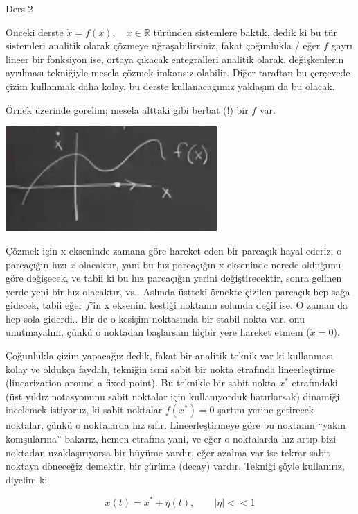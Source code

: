\documentclass[12pt,fleqn]{article}\usepackage{../../common}
\begin{document}
Ders 2

Önceki derste $\dot{x} = f(x), \quad x \in \mathbb{R}$ türünden sistemlere
baktık, dedik ki bu tür sistemleri analitik olarak çözmeye uğraşabilirsiniz,
fakat çoğunlukla / eğer $f$ gayrı lineer bir fonksiyon ise, ortaya çıkacak
entegralleri analitik olarak, değişkenlerin ayrılması tekniğiyle mesela çözmek
imkansız olabilir. Diğer taraftan bu çerçevede çizim kullanmak daha kolay, bu
derste kullanacağımız yaklaşım da bu olacak.

Örnek üzerinde görelim; mesela alttaki gibi berbat (!) bir $f$ var. 

\includegraphics[height=4cm]{02_01.png}

Çözmek için x ekseninde zamana göre hareket eden bir parcaçık hayal ederiz, o
parcaçığın hızı $\dot{x}$ olacaktır, yani bu hız parcaçığın x ekseninde nerede
olduğunu göre değişecek, ve tabii ki bu hız parcaçığın yerini değiştirecektir,
sonra gelinen yerde yeni bir hız olacaktır, vs.. Aslında üstteki örnekte çizilen
parcaçık hep sağa gidecek, tabii eğer $f$'in x eksenini kestiği noktanın solunda
değil ise. O zaman da hep sola giderdi.. Bir de o kesişim noktasında bir stabil
nokta var, onu unutmayalım, çünkü o noktadan başlarsam hiçbir yere hareket etmem
($\dot{x}=0$).

Çoğunlukla çizim yapacağız dedik, fakat bir analitik teknik var ki kullanması
kolay ve oldukça faydalı, tekniğin ismi sabit bir nokta etrafında lineerleştirme
(linearization around a fixed point). Bu teknikle bir sabit nokta $x^\ast$
etrafındaki (üst yıldız notasyonunu sabit noktalar için kullanıyorduk
hatırlarsak) dinamiği incelemek istiyoruz, ki sabit noktalar $f(x^\ast)=0$ şartını
yerine getirecek noktalar, çünkü o noktalarda hız sıfır. Lineerleştirmeye göre
bu noktanın ``yakın komşularına'' bakarız, hemen etrafına yani, ve eğer o
noktalarda hız artıp bizi noktadan uzaklaşırıyorsa bir büyüme vardır, eğer
azalma var ise tekrar sabit noktaya döneceğiz demektir, bir çürüme (decay)
vardır. Tekniği şöyle kullanırız, diyelim ki

$$ x(t) = x^\ast + \eta(t), \qquad  |\eta| << 1 $$
\end{document}
